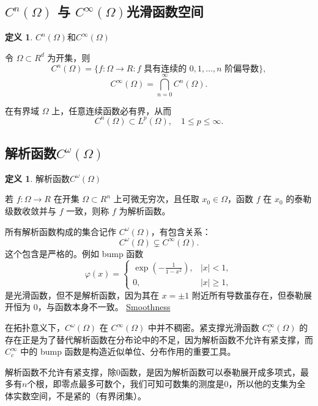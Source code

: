 \documentclass[12pt,a4paper]{article}
\newcommand{\R}{\mathbb{R}}                %
\def\R{R}%
\theoremstyle{plain}
\theoremstyle{definition}
\newtheorem{definition}[theorem]{定义}
\theoremstyle{remark}
\begin{document}
	

	
	\subsection{\texorpdfstring{$C^n(\Omega)$}{Cn} 与 \texorpdfstring{$C^\infty(\Omega)$}{C∞}光滑函数空间}
	
	\begin{definition}$C^n(\Omega)$和$C^\infty(\Omega)$
		
		令 $\Omega\subset\R^d$ 为开集，则
		\[
		C^n(\Omega)
		=\{f:\Omega\to\R:\text{$f$ 具有连续的 $0,1,\dots,n$ 阶偏导数}\},
		\]
		\[
		C^\infty(\Omega)
		=\bigcap_{n=0}^\infty C^n(\Omega).
		\]
	\end{definition}
	
	在有界域 $\Omega$ 上，任意连续函数必有界，从而
	\[
	C^n(\Omega)\subset L^p(\Omega),\quad 1\le p\le\infty.
	\]
	
	\subsection{解析函数$C^\omega(\Omega)$}
	
	\begin{definition}解析函数$C^\omega(\Omega)$
		
		若 $f:\Omega\to\R$ 在开集 $\Omega\subset\R^n$ 上可微无穷次，且任取 $x_0\in\Omega$，函数 $f$ 在 $x_0$ 的泰勒级数收敛并与 $f$ 一致，则称 $f$ 为解析函数。
	\end{definition}
	
	所有解析函数构成的集合记作 $C^\omega(\Omega)$，有包含关系：
	\[
	C^\omega(\Omega)\subsetneq C^\infty(\Omega).
	\]
	这个包含是严格的。例如 bump 函数
	\[
	\varphi(x)=
	\begin{cases}
		\exp\left(-\frac{1}{1-x^2}\right), & |x|<1, \\
		0, & |x|\ge 1,
	\end{cases}
	\]
	是光滑函数，但不是解析函数，因为其在 $x=\pm 1$ 附近所有导数虽存在，但泰勒展开恒为 0，与函数本身不一致。
	\href{https://en.wikipedia.org/wiki/Smoothness}{Smoothness}
	
	在拓扑意义下，$C^\omega(\Omega)$ 在 $C^\infty(\Omega)$ 中并不稠密。紧支撑光滑函数 $C_c^\infty(\Omega)$ 的存在正是为了替代解析函数在分布论中的不足，因为解析函数不允许有紧支撑，而 $C_c^\infty$ 中的 bump 函数是构造近似单位、分布作用的重要工具。
	
	解析函数不允许有紧支撑，除0函数，是因为解析函数可以泰勒展开成多项式，最多有$n$个根，即零点最多可数个，我们可知可数集的测度是0，所以他的支集为全体实数空间，不是紧的（有界闭集）。
	
\end{document}
